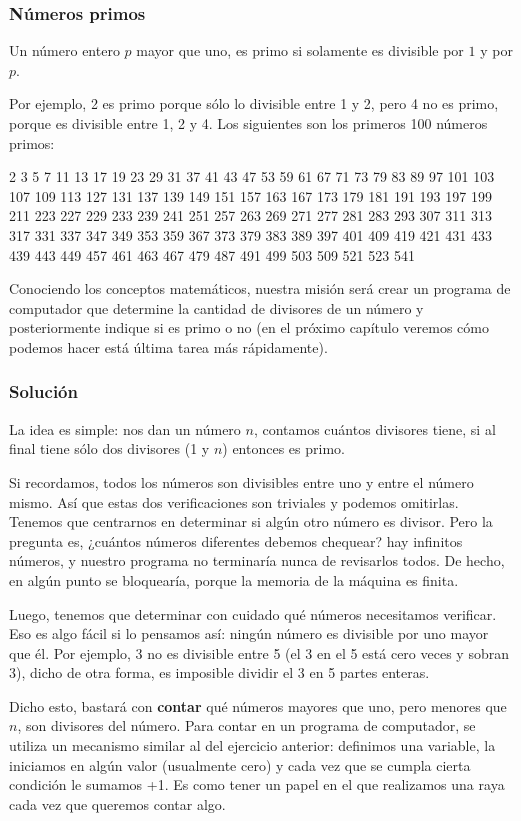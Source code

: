 \subsubsection{Números primos}

Un número entero $p$ mayor que uno, es  primo si solamente es divisible por $1$ y por $p$.  

Por ejemplo, 2 es primo porque sólo lo divisible entre 1 y 2, pero 4 no es primo, porque es divisible entre 1, 2 y 4. Los siguientes son los primeros 100 números primos:

2 3 5 7 11 13 17 19 23 29 31 37 41 43 47 53 59 61 67 71 73 79 83 89 97 101 103 107 109 113 127 131 137 139 149 151 157 163 167 173 179 181 191 193 197 199 211 223 227 229 233 239 241 251 257 263 269 271 277 281 283 293 307 311 313 317 331 337 347 349 353 359 367 373 379 383 389 397 401 409 419 421 431 433 439 443 449 457 461 463 467 479 487 491 499 503 509 521 523 541 

Conociendo los conceptos matemáticos, nuestra misión será crear un programa de computador que determine la cantidad de divisores de un número y posteriormente indique si es primo o no (en el próximo capítulo veremos cómo podemos hacer está última tarea más rápidamente).

\subsubsection{Solución}

La idea es simple: nos dan un número $n$, contamos cuántos divisores tiene, si al final tiene sólo dos divisores (1 y $n$) entonces es primo.

Si recordamos, todos los números son divisibles entre uno y entre el número mismo. Así que estas dos verificaciones son triviales y podemos omitirlas. Tenemos que centrarnos en determinar si algún otro número es divisor. Pero la pregunta es, ¿cuántos números diferentes debemos chequear? hay infinitos números, y nuestro programa no terminaría nunca de revisarlos todos. De hecho, en algún punto se bloquearía, porque la memoria de la máquina es finita. 

Luego, tenemos que determinar con cuidado qué números necesitamos verificar. Eso es algo fácil si lo pensamos así: ningún número es divisible por uno mayor que él. Por ejemplo, 3 no es divisible entre 5 (el 3 en el 5 está cero veces y sobran 3), dicho de otra forma, es imposible dividir el 3 en 5 partes enteras.

Dicho esto, bastará con \textbf{contar} qué números mayores que uno, pero menores que $n$, son divisores del número. Para contar en un programa de computador, se utiliza un mecanismo similar al del ejercicio anterior: definimos una variable, la iniciamos en algún valor (usualmente cero) y cada vez que se cumpla cierta condición le sumamos +1. Es como tener un papel en el que realizamos una raya cada vez que queremos contar algo.

